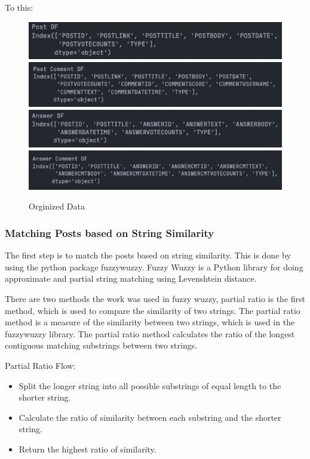 \noindent To this:
\begin{figure}[H]
  \noindent \includegraphics[scale=0.65]{post_df.png}\\
  \includegraphics[scale=0.65]{post_comments_df.png}\\
  \includegraphics[scale=0.65]{answer_df.png}\\
  \includegraphics[scale=0.65]{answer_comment_df.png}\\
  \caption{Orginized Data}
  \label{orgainzed_data }
\end{figure}

\subsubsection{Matching Posts based on String Similarity} \label{matching-posts}
The first step is to match the posts based on string similarity. This is done by using the python package fuzzywuzzy. Fuzzy Wuzzy is a Python library for doing approximate and partial string matching using Levenshtein distance. 

There are two methods the work was used in fuzzy wuzzy, partial ratio is the first method, which is used to compare the similarity of two strings. The partial ratio method is a measure of the similarity between two strings, which is used in the fuzzywuzzy library. The partial ratio method calculates the ratio of the longest contiguous matching substrings between two strings.

Partial Ratio Flow:
\begin{itemize}
  \item Split the longer string into all possible substrings of equal length to the shorter string.
  \item Calculate the ratio of similarity between each substring and the shorter string.
  \item Return the highest ratio of similarity.
\end{itemize}

